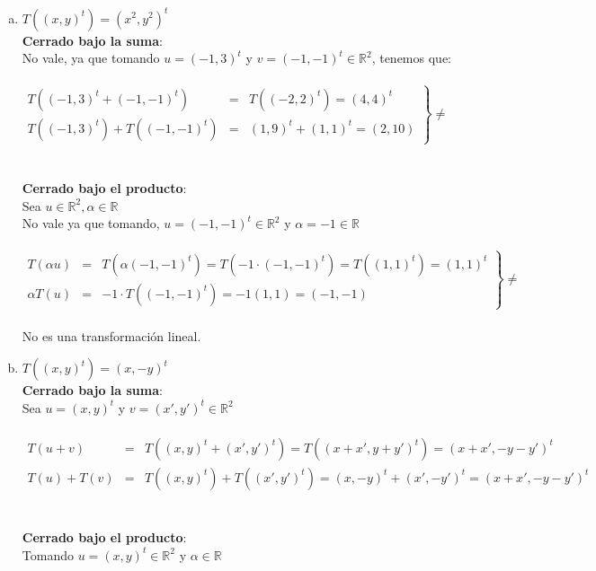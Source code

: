 \documentclass{article}
\begin{document}
\begin{enumerate}[a.]
	\item
		$T((x,y)^t) = (x^2,y^2)^t$ \\
		\textbf{Cerrado bajo la suma}: \\
		No vale, ya que tomando $u=(-1,3)^t$ y $v=(-1,-1)^t \in \mathbb{R}^2$, tenemos que: \\ \\
		$
		\left.
		\begin{array}{rlc}
		T((-1,3)^t+(-1,-1)^t) &=& T((-2,2)^t) = (4,4)^t \\
		T((-1,3)^t) + T((-1,-1)^t) &=& (1,9)^t+(1,1)^t = (2,10)
		\end{array}
		\right \} \not =
		$
		\\ \\ \\
		\textbf{Cerrado bajo el producto}: \\
		Sea $u \in \mathbb{R}^2, \alpha \in \mathbb{R}$ \\
		No vale ya que tomando, $u=(-1,-1)^t \in \mathbb{R}^2$ y $\alpha=-1 \in \mathbb{R}$ \\ \\
		$
		\left.
		\begin{array}{rlc}
		T(\alpha u) &=& T(\alpha (-1,-1)^t) = T(-1 \cdot (-1,-1)^t) = T( (1,1)^t ) = (1,1)^t\\
		\alpha T(u) &=& -1 \cdot T((-1,-1)^t) = -1(1,1) = (-1,-1)
		\end{array}
		\right \} \not =
		$ \\ \\
 		No es una transformación lineal. 
	\item
		$T((x,y)^t) = (x,-y)^t$ \\
		\textbf{Cerrado bajo la suma}: \\
		Sea $u=(x,y)^t$ y $v = (x',y')^t \in \mathbb{R}^2$ \\ \\
		$
		\begin{array}{rlc}
		T(u+v) &=& T((x,y)^t+(x',y')^t) = T((x+x',y+y')^t) = (x+x',-y-y')^t \\
		T(u)+T(v) &=& T((x,y)^t) + T((x',y')^t) = (x,-y)^t + (x',-y')^t = (x+x',-y-y')^t
		\end{array}
		$
		\\ \\ \\
		\textbf{Cerrado bajo el producto}: \\
		Tomando $u=(x,y)^t \in \mathbb{R}^2$ y $\alpha \in \mathbb{R}$ \\ \\

\end{enumerate}
\end{document}
